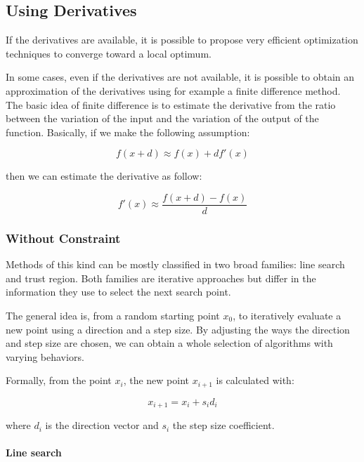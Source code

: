 \subsection{Using Derivatives}

If the derivatives are available, it is possible to propose very efficient optimization techniques to converge toward a local optimum.

In some cases, even if the derivatives are not available, it is possible to obtain an approximation of the derivatives using for example a finite difference method. The basic idea of finite difference is to estimate the derivative from the ratio between the variation of the input and the variation of the output of the function.
Basically, if we make the following assumption:

\begin{equation*}f(x + d) \approx f(x) +df'(x)\end{equation*}

then we can estimate the derivative as follow:

\begin{equation*}f'(x) \approx \frac{f(x + d)  - f(x)}{d}\end{equation*}

\subsubsection{Without Constraint}

Methods of this kind can be mostly classified in two broad families: line search and trust region.
Both families are iterative approaches but differ in the information they use to select the next search point.

The general idea is, from a random starting point $x_0$, to iteratively evaluate a new point using a direction and a step size.
By adjusting the ways the direction and step size are chosen, we can obtain a whole selection of algorithms with varying behaviors.

Formally, from the point $x_i$, the new point $x_{i+1}$ is calculated with:

\[ x_{i+1} = x_i +s_id_i \]

where $d_i$ is the direction vector and $s_i$ the step size coefficient.

\paragraph{Line search}

